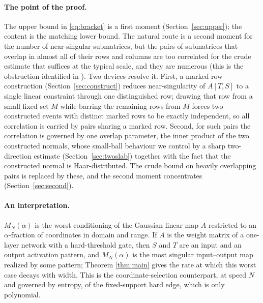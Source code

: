 \documentclass[11pt,reqno]{amsart}
\theoremstyle{plain}
\theoremstyle{definition}
\theoremstyle{remark}
\begin{document}
\paragraph{The point of the proof.}
The upper bound in \eqref{eq:bracket} is a first moment (Section~\ref{sec:upper}); the content is the
matching lower bound. The natural route is a second moment for the number of near-singular
submatrices, but the pairs of submatrices that overlap in almost all of their rows and columns are
too correlated for the crude estimate that suffices at the typical scale, and they are numerous
(this is the obstruction identified in \cite{shmalo}). Two devices resolve it. First, a marked-row
construction (Section~\ref{sec:construct}) reduces near-singularity of $A[T,S]$ to a single linear
constraint through one distinguished row; drawing that row from a small fixed set $M$ while barring
the remaining rows from $M$ forces two constructed events with distinct marked rows to be exactly
independent, so all correlation is carried by pairs sharing a marked row. Second, for such pairs the
correlation is governed by one overlap parameter, the inner product of the two constructed normals,
whose small-ball behaviour we control by a sharp two-direction estimate (Section~\ref{sec:twoslab})
together with the fact that the constructed normal is Haar-distributed. The crude bound on heavily
overlapping pairs is replaced by these, and the second moment concentrates
(Section~\ref{sec:second}).

\paragraph{An interpretation.}
$M_N(\alpha)$ is the worst conditioning of the Gaussian linear map $A$ restricted to an
$\alpha$-fraction of coordinates in domain and range. If $A$ is the weight matrix of a one-layer
network with a hard-threshold gate, then $S$ and $T$ are an input and an output activation pattern,
and $M_N(\alpha)$ is the most singular input--output map realized by some pattern; Theorem
\ref{thm:main} gives the rate at which this worst case decays with width. This is the
coordinate-selection counterpart, at speed $N$ and governed by entropy, of the fixed-support hard
edge, which is only polynomial.
\end{document}
